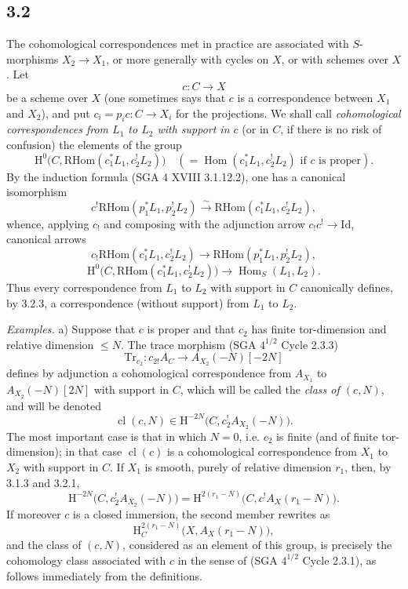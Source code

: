 \documentclass[11pt]{article}
\renewcommand{\H}{\mathrm{H}}
\DeclareMathOperator{\Hom}{Hom}
\providecommand{\RHom}{\mathrm{RHom}}
\providecommand{\Id}{\mathrm{Id}}
\providecommand{\RHom}{\mathrm{RHom}}
\providecommand{\Hom}{\operatorname{Hom}}
\providecommand{\RHom}{\mathrm R\mathcal{H}om}
\providecommand{\RHom}{\mathrm{RHom}}
\begin{document}
\subsection*{3.2}
The cohomological correspondences met in practice are associated with $S$-morphisms $X_2\to X_1$, or more generally with cycles on $X$, or with schemes over $X$. Let
\[
c:C\longrightarrow X
\]
be a scheme over $X$ (one sometimes says that $c$ is a correspondence between $X_1$ and $X_2$), and put $c_i=p_ic:C\to X_i$ for the projections. We shall call \emph{cohomological correspondences from $L_1$ to $L_2$ with support in $c$} (or in $C$, if there is no risk of confusion) the elements of the group
\[
\H^0\bigl(C,\RHom(c_1^*L_1,c_2^!L_2)\bigr)
\quad(=\Hom(c_1^*L_1,c_2^!L_2)\text{ if }c\text{ is proper}).
\]
By the induction formula (SGA 4 XVIII 3.1.12.2), one has a canonical isomorphism
\begin{equation}
c^!\RHom(p_1^*L_1,p_2^!L_2)
\xrightarrow{\sim}
\RHom(c_1^*L_1,c_2^!L_2),
\tag{3.2.1}
\end{equation}
whence, applying $c_!$ and composing with the adjunction arrow $c_!c^!\to \Id$, canonical arrows
\begin{equation}
c_!\RHom(c_1^*L_1,c_2^!L_2)
\longrightarrow
\RHom(p_1^*L_1,p_2^!L_2),
\tag{3.2.2}
\end{equation}
\begin{equation}
\H^0\bigl(C,\RHom(c_1^*L_1,c_2^!L_2)\bigr)
\longrightarrow
\Hom_S(L_1,L_2).
\tag{3.2.3}
\end{equation}
Thus every correspondence from $L_1$ to $L_2$ with support in $C$ canonically defines, by 3.2.3, a correspondence (without support) from $L_1$ to $L_2$.

\emph{Examples.} a) Suppose that $c$ is proper and that $c_2$ has finite tor-dimension and relative dimension $\leq N$. The trace morphism (SGA $4^{1/2}$ Cycle 2.3.3)
\[
\mathrm{Tr}_{c_2}:c_{2!}A_C\longrightarrow A_{X_2}(-N)[-2N]
\]
defines by adjunction a cohomological correspondence from $A_{X_1}$ to $A_{X_2}(-N)[2N]$ with support in $C$, which will be called the \emph{class of $(c,N)$}, and will be denoted
\begin{equation}
\operatorname{cl}(c,N)\in \H^{-2N}\bigl(C,c_2^!A_{X_2}(-N)\bigr).
\tag{3.2.4}
\end{equation}
The most important case is that in which $N=0$, i.e. $c_2$ is finite (and of finite tor-dimension); in that case $\operatorname{cl}(c)$ is a cohomological correspondence from $X_1$ to $X_2$ with support in $C$. If $X_1$ is smooth, purely of relative dimension $r_1$, then, by 3.1.3 and 3.2.1,
\begin{equation}
\H^{-2N}\bigl(C,c_2^!A_{X_2}(-N)\bigr)
=
\H^{2(r_1-N)}\bigl(C,c^!A_X(r_1-N)\bigr).
\tag{3.2.5}
\end{equation}
If moreover $c$ is a closed immersion, the second member rewrites as
\[
\H^{2(r_1-N)}_C\bigl(X,A_X(r_1-N)\bigr),
\]
and the class of $(c,N)$, considered as an element of this group, is precisely the cohomology class associated with $c$ in the sense of (SGA $4^{1/2}$ Cycle 2.3.1), as follows immediately from the definitions.
\end{document}
